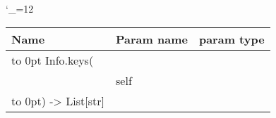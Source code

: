 \begingroup \catcode`\_=12 \tt
\begin{tabular}{lll}
\toprule
\textrm{Name}&\textrm{Param name}&\textrm{param type}\\
\midrule
\hbox to 0pt {Info.keys(\hss}\\
& self\\
\hbox to 0pt{) -> List[str]\hss}\\
\bottomrule
\end{tabular}
\endgroup

